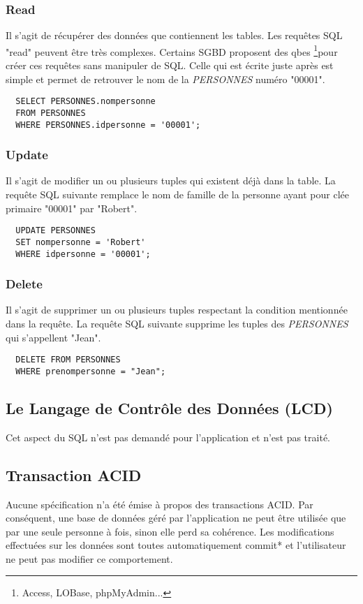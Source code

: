 \subsubsection{Read}
Il s'agit de récupérer des données que contiennent les tables.
Les requêtes SQL  "read" peuvent être très complexes.
Certains SGBD proposent des \glspl{qbe}
\footnote{Access, LOBase, phpMyAdmin...}pour créer ces requêtes sans manipuler de SQL.
Celle qui est écrite juste après est simple et permet de retrouver le nom de la \textit{PERSONNES} numéro "00001".
\begin{lstlisting}
  SELECT PERSONNES.nompersonne
  FROM PERSONNES
  WHERE PERSONNES.idpersonne = '00001';
\end{lstlisting}

\subsubsection{Update}
Il s'agit de modifier un ou plusieurs tuples qui existent déjà dans la table.
La requête SQL suivante remplace le nom de famille de la personne ayant pour clée primaire "00001" par "Robert".
\begin{lstlisting}
  UPDATE PERSONNES
  SET nompersonne = 'Robert'
  WHERE idpersonne = '00001';
\end{lstlisting}

\subsubsection{Delete}
Il s'agit de supprimer un ou plusieurs tuples respectant la condition mentionnée dans la requête.
La requête SQL suivante supprime les tuples des \textit{PERSONNES} qui s'appellent "Jean".
\begin{lstlisting}
  DELETE FROM PERSONNES
  WHERE prenompersonne = "Jean";
\end{lstlisting}

\subsection{Le Langage de Contrôle des Données (LCD)}
Cet aspect du SQL n'est pas demandé pour l'application et n'est pas traité.

\subsection{Transaction ACID}
Aucune spécification n'a été émise à propos des transactions ACID. Par conséquent, une base de données géré par l'application ne peut être utilisée que par une seule personne à fois, sinon elle perd sa cohérence. Les modifications effectuées sur les données sont toutes automatiquement \gls{commit}* et l'utilisateur ne peut pas modifier ce comportement.

